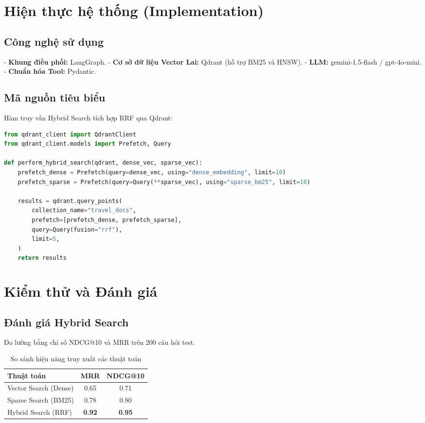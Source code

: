 \documentclass[12pt,a4paper]{report}
\begin{document}
\chapter{Hiện thực hệ thống (Implementation)}
\section{Công nghệ sử dụng}
- \textbf{Khung điều phối:} LangGraph.
- \textbf{Cơ sở dữ liệu Vector Lai:} Qdrant (hỗ trợ BM25 và HNSW).
- \textbf{LLM:} gemini-1.5-flash / gpt-4o-mini.
- \textbf{Chuẩn hóa Tool:} Pydantic.

\section{Mã nguồn tiêu biểu}
Hàm truy vấn Hybrid Search tích hợp RRF qua Qdrant:
\begin{lstlisting}[language=Python]
from qdrant_client import QdrantClient
from qdrant_client.models import Prefetch, Query

def perform_hybrid_search(qdrant, dense_vec, sparse_vec):
    prefetch_dense = Prefetch(query=dense_vec, using="dense_embedding", limit=10)
    prefetch_sparse = Prefetch(query=Query(**sparse_vec), using="sparse_bm25", limit=10)
    
    results = qdrant.query_points(
        collection_name="travel_docs",
        prefetch=[prefetch_dense, prefetch_sparse],
        query=Query(fusion="rrf"),
        limit=5,
    )
    return results
\end{lstlisting}

\chapter{Kiểm thử và Đánh giá}
\section{Đánh giá Hybrid Search}
Đo lường bằng chỉ số NDCG@10 và MRR trên 200 câu hỏi test.
\begin{table}[h]
\centering
\begin{tabular}{|l|c|c|}
\hline
\textbf{Thuật toán} & \textbf{MRR} & \textbf{NDCG@10} \\ \hline
Vector Search (Dense) & 0.65 & 0.71 \\ \hline
Sparse Search (BM25) & 0.78 & 0.80 \\ \hline
Hybrid Search (RRF) & \textbf{0.92} & \textbf{0.95} \\ \hline
\end{tabular}
\caption{So sánh hiệu năng truy xuất các thuật toán}
\end{table}
\end{document}
